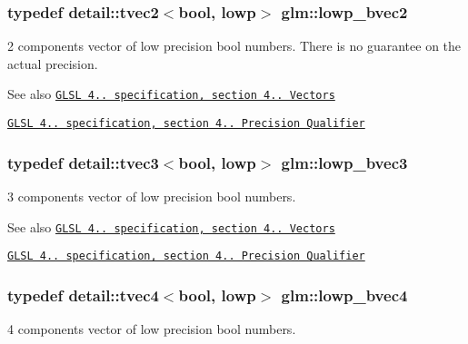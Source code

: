 \subsubsection[{\texorpdfstring{lowp\+\_\+bvec2}{lowp_bvec2}}]{\setlength{\rightskip}{0pt plus 5cm}typedef detail\+::tvec2$<$bool, lowp$>$ {\bf glm\+::lowp\+\_\+bvec2}}\hypertarget{group__core__precision_ga8ff6222d4bb4245106dab0727c8e8a45}{}\label{group__core__precision_ga8ff6222d4bb4245106dab0727c8e8a45}
2 components vector of low precision bool numbers. There is no guarantee on the actual precision.

\begin{DoxySeeAlso}{See also}
\href{http://www.opengl.org/registry/doc/GLSLangSpec.4.20.8.pdf}{\tt G\+L\+SL 4.. specification, section 4.. Vectors} 

\href{http://www.opengl.org/registry/doc/GLSLangSpec.4.20.8.pdf}{\tt G\+L\+SL 4.. specification, section 4.. Precision Qualifier} 
\end{DoxySeeAlso}
\subsubsection[{\texorpdfstring{lowp\+\_\+bvec3}{lowp_bvec3}}]{\setlength{\rightskip}{0pt plus 5cm}typedef detail\+::tvec3$<$bool, lowp$>$ {\bf glm\+::lowp\+\_\+bvec3}}\hypertarget{group__core__precision_ga17ac2986f7b315a2ac4ee2662b5be9cb}{}\label{group__core__precision_ga17ac2986f7b315a2ac4ee2662b5be9cb}
3 components vector of low precision bool numbers.

\begin{DoxySeeAlso}{See also}
\href{http://www.opengl.org/registry/doc/GLSLangSpec.4.20.8.pdf}{\tt G\+L\+SL 4.. specification, section 4.. Vectors} 

\href{http://www.opengl.org/registry/doc/GLSLangSpec.4.20.8.pdf}{\tt G\+L\+SL 4.. specification, section 4.. Precision Qualifier} 
\end{DoxySeeAlso}
\subsubsection[{\texorpdfstring{lowp\+\_\+bvec4}{lowp_bvec4}}]{\setlength{\rightskip}{0pt plus 5cm}typedef detail\+::tvec4$<$bool, lowp$>$ {\bf glm\+::lowp\+\_\+bvec4}}\hypertarget{group__core__precision_ga24c651dc8cb20779b3773428aef4f7f4}{}\label{group__core__precision_ga24c651dc8cb20779b3773428aef4f7f4}
4 components vector of low precision bool numbers.

